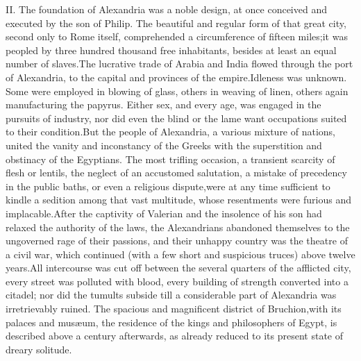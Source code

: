 II. The foundation of Alexandria was a noble design, at once
conceived and executed by the son of Philip. The beautiful and
regular form of that great city, second only to Rome itself,
comprehended a circumference of fifteen miles;\footnotemark[170] it was peopled
by three hundred thousand free inhabitants, besides at least an
equal number of slaves.\footnotemark[171] The lucrative trade of Arabia and
India flowed through the port of Alexandria, to the capital and
provinces of the empire.\footnotemark[1711] Idleness was unknown. Some were
employed in blowing of glass, others in weaving of linen, others
again manufacturing the papyrus. Either sex, and every age, was
engaged in the pursuits of industry, nor did even the blind or
the lame want occupations suited to their condition.\footnotemark[172] But the
people of Alexandria, a various mixture of nations, united the
vanity and inconstancy of the Greeks with the superstition and
obstinacy of the Egyptians. The most trifling occasion, a
transient scarcity of flesh or lentils, the neglect of an
accustomed salutation, a mistake of precedency in the public
baths, or even a religious dispute,\footnotemark[173] were at any time
sufficient to kindle a sedition among that vast multitude, whose
resentments were furious and implacable.\footnotemark[174] After the captivity
of Valerian and the insolence of his son had relaxed the
authority of the laws, the Alexandrians abandoned themselves to
the ungoverned rage of their passions, and their unhappy country
was the theatre of a civil war, which continued (with a few short
and suspicious truces) above twelve years.\footnotemark[175] All intercourse
was cut off between the several quarters of the afflicted city,
every street was polluted with blood, every building of strength
converted into a citadel; nor did the tumults subside till a
considerable part of Alexandria was irretrievably ruined. The
spacious and magnificent district of Bruchion,\footnotemark[1751] with its
palaces and musæum, the residence of the kings and philosophers
of Egypt, is described above a century afterwards, as already
reduced to its present state of dreary solitude.\footnotemark[176]




